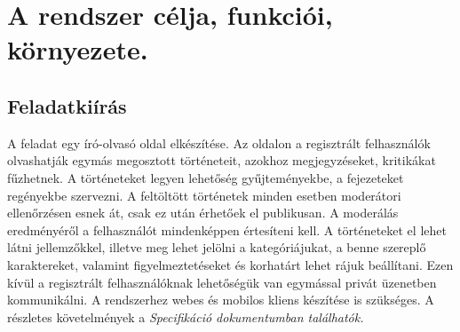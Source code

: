 \section{A rendszer célja, funkciói, környezete.}

\subsection{Feladatkiírás}
A feladat egy író-olvasó oldal elkészítése. Az oldalon a regisztrált felhasználók olvashatják egymás megosztott történeteit, azokhoz megjegyzéseket, kritikákat fűzhetnek. A történeteket legyen lehetőség gyűjteményekbe, a fejezeteket regényekbe szervezni. A feltöltött történetek minden esetben moderátori ellenőrzésen esnek át, csak ez után érhetőek el publikusan. A moderálás eredményéről a felhasználót mindenképpen értesíteni kell. A történeteket el lehet látni jellemzőkkel, illetve meg lehet jelölni a kategóriájukat, a benne szereplő karaktereket, valamint figyelmeztetéseket és korhatárt lehet rájuk beállítani. Ezen kívül a regisztrált felhasználóknak lehetőségük van egymással privát üzenetben kommunikálni. A rendszerhez webes és mobilos kliens készítése is szükséges.
A részletes követelmények a \it{Specifikáció} dokumentumban találhatók.
